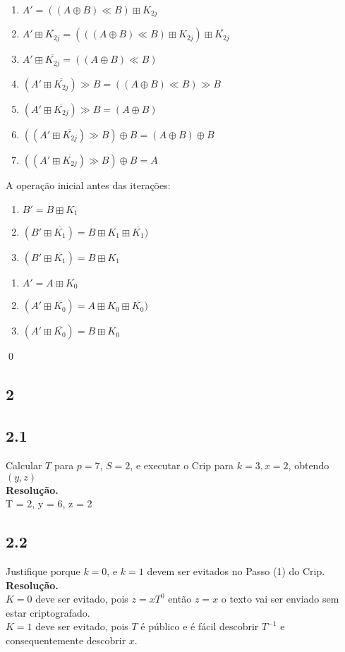\documentclass[12pt,letterpaper]{article}
\newcommand\answer{\textbf{Resolução.}\xspace}
\begin{document}
\begin{enumerate}
    \item $A' = ((A \oplus B) \ll B) \boxplus K_{2j}$
    \item $A' \boxplus \overline{K_{2j}} = (((A \oplus B) \ll B) \boxplus K_{2j}) \boxplus \overline{K_{2j}}$
    \item $A' \boxplus \overline{K_{2j}} = ((A \oplus B) \ll B)$
    \item $(A' \boxplus \overline{K_{2j}}) \gg B = ((A \oplus B) \ll B) \gg B$
    \item $(A' \boxplus \overline{K_{2j}}) \gg B = (A \oplus B)$
    \item $((A' \boxplus \overline{K_{2j}}) \gg B) \oplus B = (A \oplus B) \oplus B$
    \item $((A' \boxplus \overline{K_{2j}}) \gg B) \oplus B = A$
\end{enumerate}

    A operação inicial antes das iterações: \\
\begin{enumerate}
    \item $B' = B \boxplus K_1$
    \item $(B' \boxplus \overline{K_1}) = B \boxplus K_1 \boxplus \overline{K_1}) $
    \item $(B' \boxplus \overline{K_1}) = B \boxplus K_1$
\end{enumerate}

\begin{enumerate}
    \item $A' = A \boxplus K_0$
    \item $(A' \boxplus \overline{K_0}) = A \boxplus K_0 \boxplus \overline{K_0}) $
    \item $(A' \boxplus \overline{K_0}) = B \boxplus K_0$
\end{enumerate}
\qed

\subsection*{2}
\subsection*{2.1}
Calcular $T$ para $p = 7$, $S = 2$, e executar o Crip para $k = 3, x = 2$, obtendo $(y,z)$ \\
\answer \\
T = 2, y = 6, z = 2

\subsection*{2.2}
Justifique porque $k = 0$, e $k = 1$ devem ser evitados no Passo (1) do Crip. \\
\answer \\
    $K = 0$ deve ser evitado, pois $z = xT^0$ então $z = x$ o texto vai ser enviado sem estar criptografado. \\
    $K = 1$ deve ser evitado, pois $T$ é público e é fácil descobrir $T^{-1}$ e consequentemente descobrir $x$.
\end{document}
